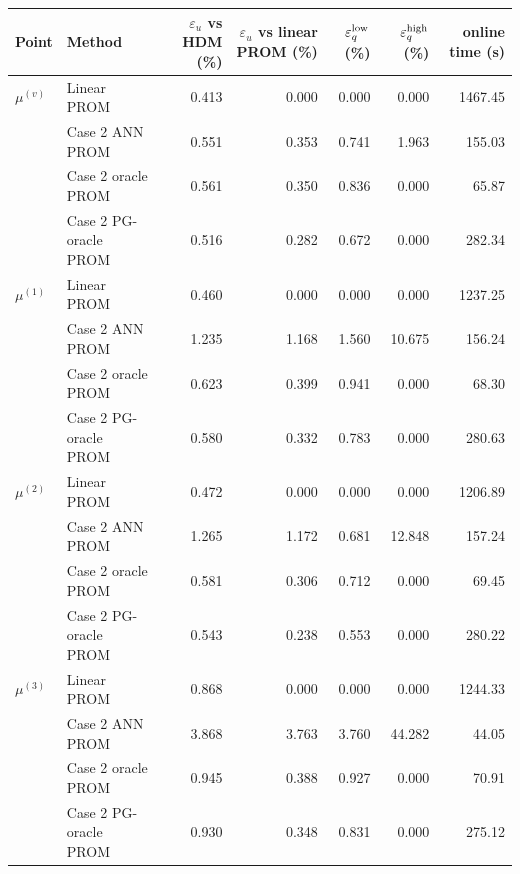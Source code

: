 \begin{tabular}{llrrrrr}
\toprule
Point & Method & $\varepsilon_u$ vs HDM (\%) & $\varepsilon_u$ vs linear PROM (\%) & $\varepsilon_q^{\rm low}$ (\%) & $\varepsilon_q^{\rm high}$ (\%) & online time (s) \\
\midrule
$\mu^{(v)}$ & Linear PROM & 0.413 & 0.000 & 0.000 & 0.000 & 1467.45 \\
 & Case 2 ANN PROM & 0.551 & 0.353 & 0.741 & 1.963 & 155.03 \\
 & Case 2 oracle PROM & 0.561 & 0.350 & 0.836 & 0.000 & 65.87 \\
 & Case 2 PG-oracle PROM & 0.516 & 0.282 & 0.672 & 0.000 & 282.34 \\
\midrule
$\mu^{(1)}$ & Linear PROM & 0.460 & 0.000 & 0.000 & 0.000 & 1237.25 \\
 & Case 2 ANN PROM & 1.235 & 1.168 & 1.560 & 10.675 & 156.24 \\
 & Case 2 oracle PROM & 0.623 & 0.399 & 0.941 & 0.000 & 68.30 \\
 & Case 2 PG-oracle PROM & 0.580 & 0.332 & 0.783 & 0.000 & 280.63 \\
\midrule
$\mu^{(2)}$ & Linear PROM & 0.472 & 0.000 & 0.000 & 0.000 & 1206.89 \\
 & Case 2 ANN PROM & 1.265 & 1.172 & 0.681 & 12.848 & 157.24 \\
 & Case 2 oracle PROM & 0.581 & 0.306 & 0.712 & 0.000 & 69.45 \\
 & Case 2 PG-oracle PROM & 0.543 & 0.238 & 0.553 & 0.000 & 280.22 \\
\midrule
$\mu^{(3)}$ & Linear PROM & 0.868 & 0.000 & 0.000 & 0.000 & 1244.33 \\
 & Case 2 ANN PROM & 3.868 & 3.763 & 3.760 & 44.282 & 44.05 \\
 & Case 2 oracle PROM & 0.945 & 0.388 & 0.927 & 0.000 & 70.91 \\
 & Case 2 PG-oracle PROM & 0.930 & 0.348 & 0.831 & 0.000 & 275.12 \\
\bottomrule
\end{tabular}
